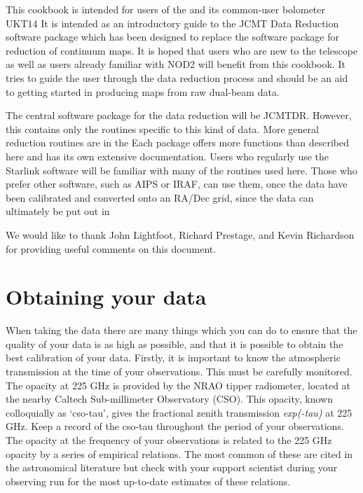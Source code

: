 \documentclass[11pt,noabs]{starlink}
\begin{document}
   This cookbook is intended for users of the
   and its common-user bolometer UKT14
   It is intended as an introductory guide to the JCMT Data Reduction
   software package
   which has been designed to replace the
   software package for reduction of
   continuum maps. It is hoped that users who are new to the telescope
   as well as users already familiar with NOD2 will benefit from this
   cookbook. It tries to guide the user through the data reduction
   process and should be an aid to
   getting started in producing maps from raw dual-beam data.

   The central software package for the data reduction will be JCMTDR.
   However, this contains only the routines specific to this kind of
   data. More general reduction routines are
   in the
   Each package offers
   more functions than described here and has its own extensive
   documentation.
   Users who regularly use the Starlink software will be familiar with
   many of the routines used here. Those who prefer other software,
   such as AIPS or IRAF, can use them, once the data have been
   calibrated and converted onto an RA/Dec grid, since the data
   can ultimately be put out in

   We would like to thank John Lightfoot, Richard Prestage, and Kevin
   Richardson for providing useful comments on this document.


\section{\label{obtain}Obtaining your data}

   When taking the data there are many things which you can do to ensure
   that the quality of your data is as high as possible, and that it is
   possible to obtain the best calibration of your data. Firstly, it is
   important to know the atmospheric transmission at the time of your
   observations. This must be carefully monitored. The opacity at
   225 GHz is provided by the NRAO tipper radiometer, located at the
   nearby Caltech Sub-millimeter Observatory (CSO). This opacity, known
   colloquially as `cso-tau',
   gives the fractional zenith transmission \textit{exp(-tau)\/} at 225 GHz.
   Keep a record of the cso-tau throughout the period of your
   observations. The opacity at the frequency of your observations is
   related to the 225 GHz opacity by a series of empirical relations.
   The most common of these are cited in the astronomical literature
   but check with your support scientist during your observing run for
   the most up-to-date estimates of these relations.
\end{document}
